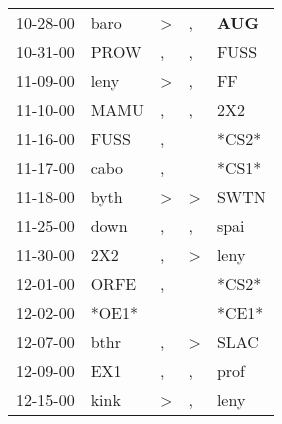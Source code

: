 \begin{supertabular}{p{0.07\textwidth}p{0.06\textwidth}p{0.02\textwidth}p{0.02\textwidth}p{0.06\textwidth}}
          10-28-00\textsuperscript{} &           baro\textsuperscript{} &     \textgreater &                , &   \textbf{AUG\textsuperscript{}} \\
          10-31-00\textsuperscript{} &           PROW\textsuperscript{} &                , &                , &           FUSS\textsuperscript{} \\
          11-09-00\textsuperscript{} &           leny\textsuperscript{} &     \textgreater &                , &             FF\textsuperscript{} \\
          11-10-00\textsuperscript{} &           MAMU\textsuperscript{} &                , &                , &            2X2\textsuperscript{} \\
          11-16-00\textsuperscript{} &           FUSS\textsuperscript{} &                , &                  &                            *CS2* \\
          11-17-00\textsuperscript{} &           cabo\textsuperscript{} &                , &                  &                            *CS1* \\
          11-18-00\textsuperscript{} &           byth\textsuperscript{} &     \textgreater &     \textgreater &           SWTN\textsuperscript{} \\
          11-25-00\textsuperscript{} &           down\textsuperscript{} &                , &                , &           spai\textsuperscript{} \\
          11-30-00\textsuperscript{} &            2X2\textsuperscript{} &                , &     \textgreater &           leny\textsuperscript{} \\
          12-01-00\textsuperscript{} &           ORFE\textsuperscript{} &                , &                  &                            *CS2* \\
          12-02-00\textsuperscript{} &                            *OE1* &                  &                  &                            *CE1* \\
          12-07-00\textsuperscript{} &           bthr\textsuperscript{} &                , &     \textgreater &           SLAC\textsuperscript{} \\
          12-09-00\textsuperscript{} &            EX1\textsuperscript{} &                , &                , &           prof\textsuperscript{} \\
          12-15-00\textsuperscript{} &           kink\textsuperscript{} &     \textgreater &                , &           leny\textsuperscript{} \\

\end{supertabular}
